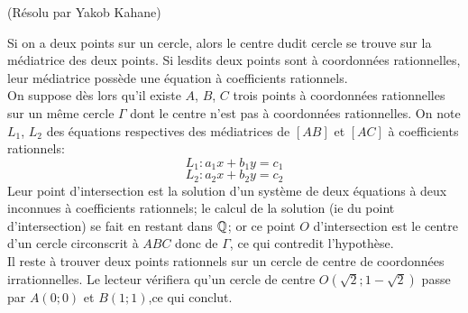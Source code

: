 \begin{sol}[133](Résolu par Yakob Kahane)

		Si on a deux points sur un cercle, alors le centre dudit cercle se trouve sur la m\'ediatrice des deux points. Si lesdits deux points sont \`a coordonn\'ees rationnelles, leur m\'ediatrice poss\`ede une \'equation \`a coefficients rationnels. \\
			On suppose d\`es lors qu'il existe $A$, $B$, $C$ trois points \`a coordonn\'ees rationnelles sur un m\^eme cercle $\Gamma$ dont le centre n'est pas \`a coordonn\'ees rationnelles. On note $L_1$, $L_2$ des \'equations respectives des m\'ediatrices de $[AB]$ et $[AC]$ \`a coefficients rationnels:
			\[L_1: a_1x+b_1y=c_1\]
			\[L_2: a_2x+b_2y=c_2\]
			Leur point d'intersection est la solution d'un syst\`eme de deux \'equations \`a deux inconnues \`a coefficients rationnels; le calcul de la solution (ie du point d'intersection) se fait en restant dans $\mathbb Q$; or ce point $O$ d'intersection est le centre d'un cercle circonscrit \`a $ABC$ donc de $\Gamma$, ce qui contredit l'hypoth\`ese. \\
			Il reste \`a trouver deux points rationnels sur un cercle de centre de coordonn\'ees irrationnelles. Le lecteur v\'erifiera qu'un cercle de centre $O(\sqrt{2};1-\sqrt{2})$ passe par $A(0;0)$ et $B(1;1)$,ce qui conclut.  
\end{sol}


